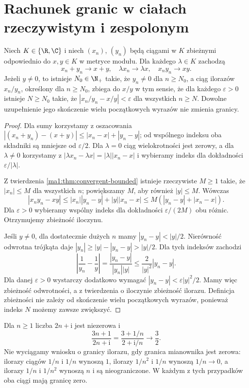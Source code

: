 \section{Rachunek granic w ciałach rzeczywistym i zespolonym}
\begin{twierdzenie}
\label{ma1:thm:limit-arithmetic}
Niech $K\in\{\R,\C\}$ i niech $(x_n)$, $(y_n)$ będą ciągami w $K$ zbieżnymi odpowiednio do $x,y\in K$ w metryce modułu. Dla każdego $\lambda\in K$ zachodzą
\[
 x_n+y_n\to x+y,\quad \lambda x_n\to\lambda x,\quad
 x_ny_n\to xy.
\]
Jeżeli $y\ne0$, to istnieje $N_0\in\N_+$ takie, że $y_n\ne0$ dla $n\ge N_0$, a ciąg ilorazów $x_n/y_n$, określony dla $n\ge N_0$, zbiega do $x/y$ w tym sensie, że dla każdego $\varepsilon>0$ istnieje $N\ge N_0$ takie, że $|x_n/y_n-x/y|<\varepsilon$ dla wszystkich $n\ge N$. Dowolne uzupełnienie jego skończenie wielu początkowych wyrazów nie zmienia granicy.
\end{twierdzenie}
\begin{proof}
Dla sumy korzystamy z oszacowania
$|(x_n+y_n)-(x+y)|\le|x_n-x|+|y_n-y|$; od wspólnego indeksu oba składniki są mniejsze od $\varepsilon/2$. Dla $\lambda=0$ ciąg wielokrotności jest zerowy, a dla $\lambda\ne0$ korzystamy z $|\lambda x_n-\lambda x|=|\lambda||x_n-x|$ i wybieramy indeks dla dokładności $\varepsilon/|\lambda|$.

Z twierdzenia \ref{ma1:thm:convergent-bounded} istnieje rzeczywiste $M\ge1$ takie, że $|x_n|\le M$ dla wszystkich $n$; powiększamy $M$, aby również $|y|\le M$. Wówczas
\[
 |x_ny_n-xy|
 \le |x_n||y_n-y|+|y||x_n-x|
 \le M(|y_n-y|+|x_n-x|).
\]
Dla $\varepsilon>0$ wybieramy wspólny indeks dla dokładności $\varepsilon/(2M)$ obu różnic. Otrzymujemy zbieżność iloczynu.

Jeśli $y\ne0$, dla dostatecznie dużych $n$ mamy $|y_n-y|<|y|/2$. Nierówność odwrotna trójkąta daje $|y_n|\ge|y|-|y_n-y|>|y|/2$. Dla tych indeksów zachodzi
\[
 \left|\frac1{y_n}-\frac1y\right|
 =\frac{|y_n-y|}{|y_n||y|}
 \le\frac{2}{|y|^2}|y_n-y|.
\]
Dla danej $\varepsilon>0$ wystarczy dodatkowo wymagać $|y_n-y|<\varepsilon|y|^2/2$. Mamy więc zbieżność odwrotności, a z twierdzenia o iloczynie zbieżność ilorazu. Definicja zbieżności nie zależy od skończenie wielu początkowych wyrazów, ponieważ indeks $N$ możemy zawsze zwiększyć.
\end{proof}
\begin{przyklad}
Dla $n\ge1$ liczba $2n+\mathrm i$ jest niezerowa i
\[
 \frac{3n+1}{2n+\mathrm i}
 =\frac{3+1/n}{2+\mathrm i/n}\longrightarrow \frac32.
\]
Nie wyciągamy wniosku o granicy ilorazu, gdy granica mianownika jest zerowa: ilorazy ciągów $1/n$ i $1/n$ wynoszą $1$, ilorazy $1/n^2$ i $1/n$ wynoszą $1/n\to0$, a ilorazy $1/n$ i $1/n^2$ wynoszą $n$ i są nieograniczone. W każdym z tych przypadków oba ciągi mają granicę zero.
\end{przyklad}

